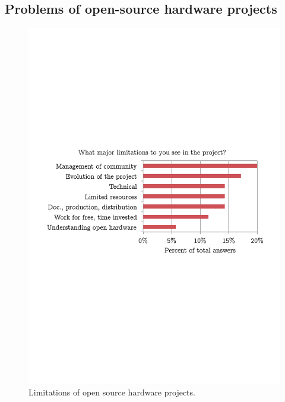 \documentclass[letterpaper, 10 pt, conference]{ieeeconf}  %
\begin{document}
\subsection{Problems of open-source hardware projects}

\begin{figure}
\centering
\includegraphics[width=\columnwidth]{figures/limitations}
\caption{Limitations of open source hardware projects.}
\label{fig:problems}
\end{figure}
\end{document}
